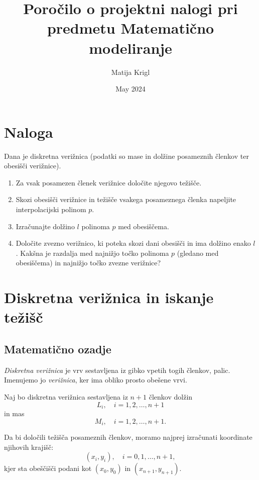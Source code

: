 \documentclass{article}
\title{Poročilo o projektni nalogi pri predmetu Matematično modeliranje}
\author{Matija Krigl}
\date{May 2024}
\begin{document}
\maketitle

\tableofcontents

\section{Naloga}
    Dana je diskretna verižnica (podatki so mase in dolžine posameznih členkov ter obesišči verižnice).
    
    \begin{enumerate}[label=(\alph*)]
        \item Za vsak posamezen členek verižnice določite njegovo težišče.
        \item Skozi obesišči verižnice in težišče vsakega posameznega členka napeljite interpolacijski polinom \( p \).
        \item Izračunajte dolžino \( l \) polinoma \( p \) med obesiščema.
        \item Določite zvezno verižnico, ki poteka skozi dani obesišči in ima dolžino enako \( l \). Kakšna je razdalja med najnižjo točko polinoma \( p \) (gledano med obesiščema) in najnižjo točko zvezne verižnice?
    \end{enumerate}
    
\section{Diskretna verižnica in iskanje težišč}
    \subsection{Matematično ozadje}
        \textit{Diskretna verižnica} je vrv sestavljena iz gibko vpetih togih členkov, palic. Imenujemo jo \textit{verižnica}, ker ima obliko prosto obešene vrvi.   
    
        Naj bo diskretna verižnica sestavljena iz \(n+1\) členkov dolžin
        \[ L_i, \quad i = 1, 2, \ldots, n+1 \]
        in mas
        \[ M_i, \quad i = 1, 2, \ldots, n+1. \]
        
        Da bi določili težišča posameznih členkov, moramo najprej izračunati koordinate njihovih krajišč:
        \[ (x_i, y_i), \quad i = 0, 1, \ldots, n+1, \]
        kjer sta obeščišči podani kot \((x_0, y_0)\) in \((x_{n+1}, y_{n+1})\).
\end{document}
